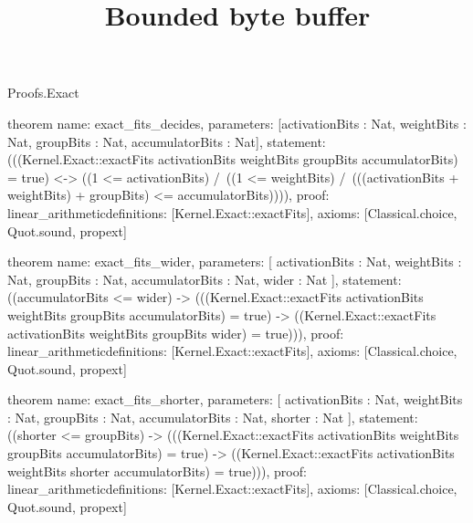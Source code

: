 \begin{lexlean}{Proofs.Exact}
\title{Bounded byte buffer}
\begin{semanticmodule}
theorem{
  name: exact_fits_decides,
  parameters: [activationBits : Nat, weightBits : Nat, groupBits : Nat, accumulatorBits : Nat],
  statement: (((Kernel.Exact::exactFits activationBits weightBits groupBits accumulatorBits) = true) <-> ((1 <= activationBits) /\ ((1 <= weightBits) /\ (((activationBits + weightBits) + groupBits) <= accumulatorBits)))),
  proof: linear_arithmetic{definitions: [Kernel.Exact::exactFits]},
  axioms: [Classical.choice, Quot.sound, propext]
}

theorem{
  name: exact_fits_wider,
  parameters: [
    activationBits : Nat,
    weightBits : Nat,
    groupBits : Nat,
    accumulatorBits : Nat,
    wider : Nat
  ],
  statement: ((accumulatorBits <= wider) -> (((Kernel.Exact::exactFits activationBits weightBits groupBits accumulatorBits) = true) -> ((Kernel.Exact::exactFits activationBits weightBits groupBits wider) = true))),
  proof: linear_arithmetic{definitions: [Kernel.Exact::exactFits]},
  axioms: [Classical.choice, Quot.sound, propext]
}

theorem{
  name: exact_fits_shorter,
  parameters: [
    activationBits : Nat,
    weightBits : Nat,
    groupBits : Nat,
    accumulatorBits : Nat,
    shorter : Nat
  ],
  statement: ((shorter <= groupBits) -> (((Kernel.Exact::exactFits activationBits weightBits groupBits accumulatorBits) = true) -> ((Kernel.Exact::exactFits activationBits weightBits shorter accumulatorBits) = true))),
  proof: linear_arithmetic{definitions: [Kernel.Exact::exactFits]},
  axioms: [Classical.choice, Quot.sound, propext]
}
\end{semanticmodule}
\end{lexlean}
